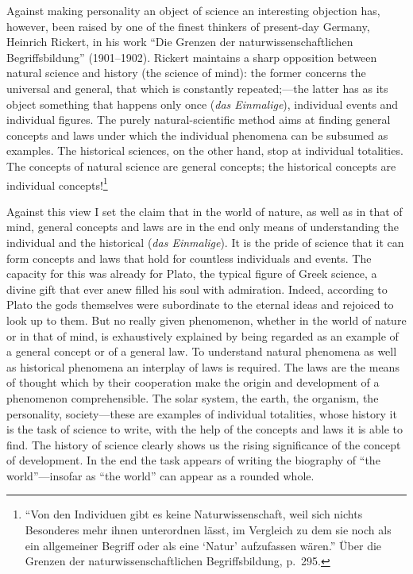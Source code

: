 \documentclass[12pt]{article}
\newcommand{\opage}[1]{\marginnote{\footnotesize\textit{[#1]}}}
\begin{document}
Against making personality an object of science an interesting objection has,
however, been raised by one of the finest thinkers of present-day Germany,
Heinrich Rickert, in his work ``Die Grenzen der naturwissenschaftlichen
Begriffsbildung'' (1901--1902). Rickert maintains a sharp opposition between
natural science and history (the science of mind): the former concerns the
universal and general, that which is constantly repeated;---the latter has as
its
\opage{20}%
object something that happens only once (\textit{das Einmalige}), individual
events and individual figures. The purely natural-scientific method aims at
finding general concepts and laws under which the individual phenomena can be
subsumed as examples. The historical sciences, on the other hand, stop at
individual totalities. The concepts of natural science are general concepts; the
historical concepts are individual concepts!\footnote{``Von den Individuen gibt
es keine Naturwissenschaft, weil sich nichts Besonderes mehr ihnen unterordnen
lässt, im Vergleich zu dem sie noch als ein allgemeiner Begriff oder als eine
`Natur' aufzufassen wären.'' Über die Grenzen der naturwissenschaftlichen
Begriffsbildung, p.~295.}

Against this view I set the claim that in the world of nature, as well as in
that of mind, general concepts and laws are in the end only means of
understanding the individual and the historical (\textit{das Einmalige}). It is
the pride of science that it can form concepts and laws that hold for countless
individuals and events. The capacity for this was already for Plato, the typical
figure of Greek science, a divine gift that ever anew filled his soul with
admiration. Indeed,
\opage{21}%
according to Plato the gods themselves were subordinate to the eternal ideas and
rejoiced to look up to them. But no really given phenomenon, whether in the
world of nature or in that of mind, is exhaustively explained by being regarded
as an example of a general concept or of a general law. To understand natural
phenomena as well as historical phenomena an interplay of laws is required. The
laws are the means of thought which by their cooperation make the origin and
development of a phenomenon comprehensible. The solar system, the earth, the
organism, the personality, society---these are examples of individual
totalities, whose history it is the task of science to write, with the help of
the concepts and laws it is able to find. The history of science clearly shows
us the rising significance of the concept of development. In the end the task
appears of writing the biography of ``the world''---insofar as ``the world'' can
appear as a rounded whole.
\end{document}
